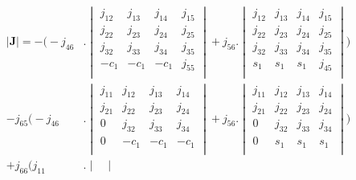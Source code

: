 \begin{align}
    |\textbf{J}| = -\Bigg(-j_{46}&.\begin{vmatrix}
                        j_{12} & j_{13} & j_{14} & j_{15} \\
                        j_{22} & j_{23} & j_{24} & j_{25} \\
                        j_{32} & j_{33} & j_{34} & j_{35} \\
                        -c_1 & -c_1 & -c_1 & j_{55} \\
                    \end{vmatrix} + j_{56}.\begin{vmatrix}
                                            j_{12} & j_{13} & j_{14} & j_{15} \\
                                            j_{22} & j_{23} & j_{24} & j_{25} \\
                                            j_{32} & j_{33} & j_{34} & j_{35} \\
                                            s_1 & s_1 & s_1 & j_{45} \\
                                        \end{vmatrix} \Bigg) \nonumber \\
    - j_{65}\Bigg(-j_{46}&.\begin{vmatrix}
                        j_{11} & j_{12} & j_{13} & j_{14} \\
                        j_{21} & j_{22} & j_{23} & j_{24} \\
                        0   & j_{32} & j_{33} & j_{34} \\
                        0   & -c_1 & -c_1 & -c_1 \\        
                    \end{vmatrix} + j_{56}.\begin{vmatrix}
                                            j_{11} & j_{12} & j_{13} & j_{14} \\
                                            j_{21} & j_{22} & j_{23} & j_{24} \\
                                            0   & j_{32} & j_{33} & j_{34} \\
                                            0   & s_1 & s_1 & s_1 \\                
                                        \end{vmatrix} \Bigg) \nonumber \\
    + j_{66}\Bigg(j_{11}&.\begin{vmatrix}

\end{vmatrix}
\end{align}
